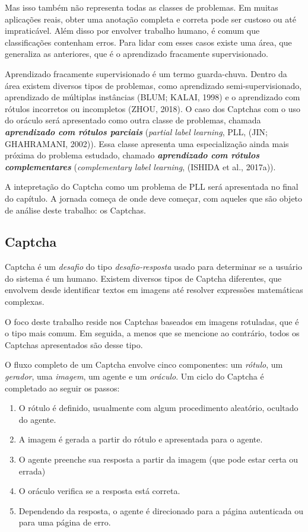 \documentclass[12pt,twoside,brazilian]{book}
\providecommand{\tightlist}{%
  \setlength{\itemsep}{0pt}\setlength{\parskip}{0pt}}
\begin{document}
Mas isso também não representa todas as classes de problemas. Em muitas
aplicações reais, obter uma anotação completa e correta pode ser custoso
ou até impraticável. Além disso por envolver trabalho humano, é comum
que classificações contenham erros. Para lidar com esses casos existe
uma área, que generaliza as anteriores, que é o aprendizado fracamente
supervisionado.

Aprendizado fracamente supervisionado é um termo guarda-chuva. Dentro da
área existem diversos tipos de problemas, como aprendizado
semi-supervisionado, aprendizado de múltiplas instâncias (BLUM; KALAI,
1998) e o aprendizado com rótulos incorretos ou incompletos (ZHOU,
2018). O caso dos Captchas com o uso do oráculo será apresentado como
outra classe de problemas, chamada \textbf{\emph{aprendizado com rótulos
parciais}} (\emph{partial label learning}, PLL, (JIN; GHAHRAMANI,
2002)). Essa classe apresenta uma especialização ainda mais próxima do
problema estudado, chamado \textbf{\emph{aprendizado com rótulos
complementares}} (\emph{complementary label learning}, (ISHIDA et al.,
2017a)).

A intepretação do Captcha como um problema de PLL será apresentada no
final do capítulo. A jornada começa de onde deve começar, com aqueles
que são objeto de análise deste trabalho: os Captchas.

\hypertarget{captcha}{%
\subsection{Captcha}\label{captcha}}

Captcha é um \emph{desafio} do tipo \emph{desafio-resposta} usado para
determinar se a usuário do sistema é um humano. Existem diversos tipos
de Captcha diferentes, que envolvem desde identificar textos em imagens
até resolver expressões matemáticas complexas.

O foco deste trabalho reside nos Captchas baseados em imagens rotuladas,
que é o tipo mais comum. Em seguida, a menos que se mencione ao
contrário, todos os Captchas apresentados são desse tipo.

O fluxo completo de um Captcha envolve cinco componentes: um
\emph{rótulo}, um \emph{gerador}, uma \emph{imagem}, um agente e um
\emph{oráculo}. Um ciclo do Captcha é completado ao seguir os passos:

\begin{enumerate}
\def\labelenumi{\arabic{enumi}.}
\tightlist
\item
  O rótulo é definido, usualmente com algum procedimento aleatório,
  ocultado do agente.
\item
  A imagem é gerada a partir do rótulo e apresentada para o agente.
\item
  O agente preenche sua resposta a partir da imagem (que pode estar
  certa ou errada)
\item
  O oráculo verifica se a resposta está correta.
\item
  Dependendo da resposta, o agente é direcionado para a página
  autenticada ou para uma página de erro.
\end{enumerate}
\end{document}
